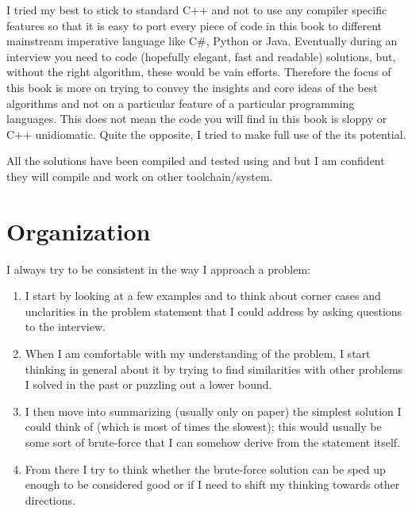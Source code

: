I tried my best to stick to standard C++ and not to use any compiler specific features so that it is easy to port every piece of code in this book to different mainstream imperative language like C\#, Python or Java.  
Eventually during an interview you need to code (hopefully elegant, fast and readable) solutions, but, without the right algorithm, these would be vain efforts. Therefore the focus of this book is more on trying to convey the insights and core ideas of the best algorithms and not on a particular feature of a particular programming languages.
This does not mean the code you will find in this book is sloppy or C++ unidiomatic. Quite the opposite, I tried to make full use of the its potential.

All the solutions have been compiled and tested using  and  but I am confident they will compile and work on other toolchain/system. 

\section*{Organization}
I always try to be consistent in the way I approach a problem:
\begin{enumerate}
    \item I start by looking at a few examples and to think about corner cases and unclarities in the problem statement that I could address by asking questions to the interview.
    \item When I am comfortable with my understanding of the problem, I start thinking in general about it by trying to find similarities with other problems I solved in the past or puzzling out a lower bound.
    \item I then move into summarizing (usually only on paper) the simplest  solution I could think of (which is most of times the slowest); this would usually be some sort of brute-force that I can somehow derive from the statement itself.
    \item  From there I  try to think whether the brute-force solution can be sped up enough to be considered good or if I need to shift my thinking towards other directions.
\end{enumerate}

